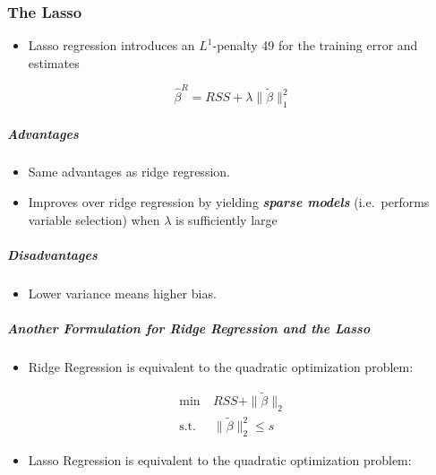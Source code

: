 \documentclass[11pt]{article}
\providecommand{\tightlist}{%
      \setlength{\itemsep}{0pt}\setlength{\parskip}{0pt}}
\begin{document}
    \hypertarget{the-lasso}{%
\subsubsection{The Lasso}\label{the-lasso}}

    \begin{itemize}
\tightlist
\item
  Lasso regression introduces an \(L^1\)-penalty 49 for the training
  error and estimates
\end{itemize}

\[\hat{\beta}^R = RSS+\lambda\|\tilde{\beta}\|^2_1\]

    \hypertarget{advantages}{%
\subparagraph{Advantages}\label{advantages}}

    \begin{itemize}
\tightlist
\item
  Same advantages as ridge regression.
\item
  Improves over ridge regression by yielding \textbf{\emph{sparse
  models}} (i.e.~performs variable selection) when \(\lambda\) is
  sufficiently large
\end{itemize}

    \hypertarget{disadvantages}{%
\subparagraph{Disadvantages}\label{disadvantages}}

    \begin{itemize}
\tightlist
\item
  Lower variance means higher bias.
\end{itemize}

    \hypertarget{another-formulation-for-ridge-regression-and-the-lasso}{%
\subparagraph{Another Formulation for Ridge Regression and the
Lasso}\label{another-formulation-for-ridge-regression-and-the-lasso}}

    \begin{itemize}
\tightlist
\item
  Ridge Regression is equivalent to the quadratic optimization problem:
\end{itemize}

\begin{align*}
\min&\ RSS + \|\tilde{\beta}\|_2\\
\text{s.t.}&\ \| \tilde{\beta} \|_2^2 \leqslant s
\end{align*}

\begin{itemize}
\tightlist
\item
  Lasso Regression is equivalent to the quadratic optimization problem:
\end{itemize}
\end{document}
